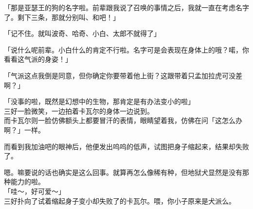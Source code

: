 「那是亚瑟王的狗的名字啦。前辈跟我说了召唤的事情之后，我就一直在考虑名字了。剩下三条，那就分别叫、和吧！」

「记不住。就叫波奇、哈奇、小白、太郎不就得了」

「说什么呢前辈。小白什么的肯定不行啦。名字可是会表现在身体上的哦？喏，你看看这气派的身姿！」

「气派这点我倒是同意，但你确定你要带着他上街？这跟带着只孟加拉虎可没差啊？」

「没事的啦，既然是幻想中的生物，那肯定是有办法变小的啦」\\

三好一脸微笑，一边拍着卡瓦尔的身体一边说到。\\

而卡瓦尔则一脸仿佛额头上都要冒汗的表情，眼睛望着我，仿佛在问「这怎么办啊？」一样。

而看到我加油吧的眼神后，他便发出呜呜的低声，试图把身子缩起来，结果却失败了。

嗯。嘛要说的话也确实是这么回事。就算再怎么像稀有种，但地狱犬显然是没有那种能力的啦。\\

「哇～，好可爱～」\\

三好扑向了试着缩起身子变小却失败了的卡瓦尔。喂，你小子原来是犬派么。\\

